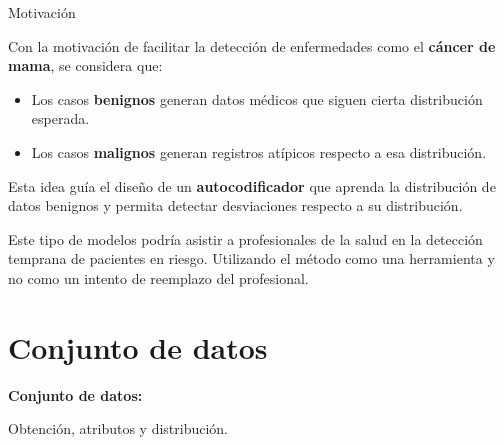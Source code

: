 \documentclass{beamer}
\begin{document}
\begin{frame}{Motivación}
	\small
	\justifying
	\begin{block}{}
		Con la motivación de facilitar la detección de enfermedades como el \textbf{cáncer de mama}, se considera que:
		\begin{itemize}
			\item Los casos \textbf{benignos} generan datos médicos que siguen cierta distribución esperada.
			\item Los casos \textbf{malignos} generan registros atípicos respecto a esa distribución.
		\end{itemize}
		
		Esta idea guía el diseño de un \textbf{autocodificador} que aprenda la distribución de datos benignos y permita detectar desviaciones respecto a su distribución.
	\end{block}
	\vspace{0.25cm}
	
	\begin{block}{}
		\small
		\justifying
		Este tipo de modelos podría asistir a profesionales de la salud en la detección temprana de pacientes en riesgo. Utilizando el método como una herramienta y no como un intento de reemplazo del profesional.
	\end{block}
	
\end{frame}


\section{Conjunto de datos}

\begin{frame}
	\begin{center}
		\textcolor{unahurverde}{\textbf{Conjunto de datos:}}
	\end{center}
	\centering
	
	Obtención, atributos y distribución.
\end{frame}
\end{document}
